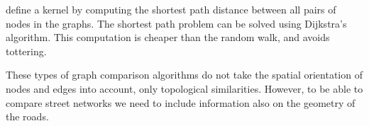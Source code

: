 
\cite{shortestpath} define a kernel by computing the shortest path distance between all pairs of nodes in the graphs. The shortest path problem can be solved using Dijkstra's algorithm. This computation is cheaper than the random walk, and avoids tottering. 

These types of graph comparison algorithms do not take the spatial orientation of nodes and edges into account, only topological similarities. However, to be able to compare street networks we need to include information also on the geometry of the roads.
\fi